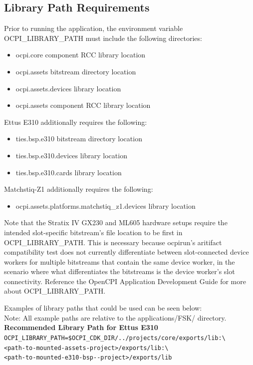 \subsection{Library Path Requirements}
\noindent Prior to running the application, the environment variable OCPI\_LIBRARY\_PATH must include the following directories:\par\medskip
	\begin{itemize}
		\item ocpi.core component RCC library location
		\item ocpi.assets bitstream directory location
		\item ocpi.assets.devices library location
		\item ocpi.assets component RCC library location
	\end{itemize}
Ettus E310 additionally requires the following:
	\begin{itemize}
		\item ties.bsp.e310 bitstream directory location
		\item ties.bsp.e310.devices library location
		\item ties.bsp.e310.cards library location
	\end{itemize}
Matchstiq-Z1 additionally requires the following:
	\begin{itemize}
		\item ocpi.assets.platforms.matchstiq\_z1.devices library location
	\end{itemize}

\noindent Note that the Stratix IV GX230 and ML605 hardware setups require the intended slot-specific bitstream's file location to be first in OCPI\_LIBRARY\_PATH. This is necessary because ocpirun's aritifact compatibility test does not currently differentiate between slot-connected device workers for multiple bitstreams that contain the same device worker, in the scenario where what differentiates the bitstreams is the device worker's slot connectivity. Reference the OpenCPI Application Development Guide for more about OCPI\_LIBRARY\_PATH. \par\medskip

\noindent Examples of library paths that could be used can be seen below:\\

Note: All example paths are relative to the applications/FSK/ directory.\\

\noindent\textbf{Recommended Library Path for Ettus E310}\\
\verb|OCPI_LIBRARY_PATH=$OCPI_CDK_DIR/../projects/core/exports/lib:\| \\
\verb|<path-to-mounted-assets-project>/exports/lib:\| \\
\verb|<path-to-mounted-e310-bsp--project>/exports/lib| \\

